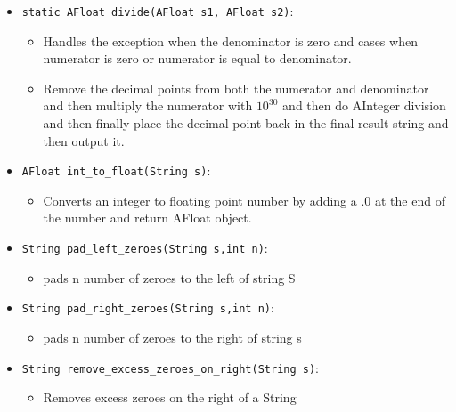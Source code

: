 \documentclass{article}
\begin{document}
\begin{itemize}
    \item \texttt{static AFloat divide(AFloat s1, AFloat s2)}:
    \begin{itemize}
    \item Handles the exception when the denominator is zero and cases when numerator is zero or numerator is equal to denominator.
    \item Remove the decimal points from both the numerator and denominator and then multiply the numerator with $10^{30}$ and then do AInteger division and then finally place the decimal point back in the final result string and then output it.
    
    \end{itemize}
\end{itemize}

\begin{itemize}
    \item \texttt{AFloat int\_to\_float(String s)}:
    \begin{itemize}
    \item Converts an integer to floating point number by adding a .0 at the end of the number and return AFloat object. 
    \end{itemize}
\end{itemize}

\begin{itemize}
    \item \texttt{String pad\_left\_zeroes(String s,int n)}:
    \begin{itemize}
    \item pads n number of zeroes to the left of string S 
    \end{itemize}
\end{itemize}


\begin{itemize}
    \item \texttt{String pad\_right\_zeroes(String s,int n)}:
    \begin{itemize}
    \item pads n number of zeroes to the right of string s 
    \end{itemize}
\end{itemize}


\begin{itemize}
    \item \texttt{String remove\_excess\_zeroes\_on\_right(String s)}:
    \begin{itemize}
    \item Removes excess zeroes on the right of a String 
    \end{itemize}
\end{itemize}
\end{document}
